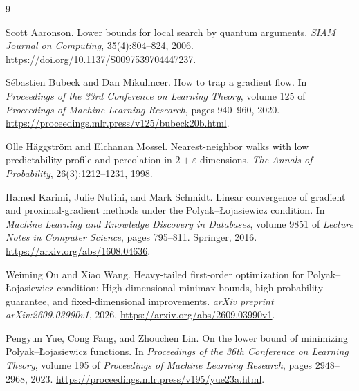 \documentclass[11pt,a4paper]{article}
\theoremstyle{definition}
\theoremstyle{remark}
\begin{document}
\begin{thebibliography}{9}

Scott Aaronson.
\newblock Lower bounds for local search by quantum arguments.
\newblock \emph{SIAM Journal on Computing}, 35(4):804--824, 2006.
\newblock \url{https://doi.org/10.1137/S0097539704447237}.

S\'ebastien Bubeck and Dan Mikulincer.
\newblock How to trap a gradient flow.
\newblock In \emph{Proceedings of the 33rd Conference on Learning Theory},
volume 125 of \emph{Proceedings of Machine Learning Research},
pages 940--960, 2020.
\newblock \url{https://proceedings.mlr.press/v125/bubeck20b.html}.

Olle H\"aggstr\"om and Elchanan Mossel.
\newblock Nearest-neighbor walks with low predictability profile and
percolation in $2+\varepsilon$ dimensions.
\newblock \emph{The Annals of Probability}, 26(3):1212--1231, 1998.

Hamed Karimi, Julie Nutini, and Mark Schmidt.
\newblock Linear convergence of gradient and proximal-gradient methods
under the Polyak--\L{}ojasiewicz condition.
\newblock In \emph{Machine Learning and Knowledge Discovery in Databases},
volume 9851 of \emph{Lecture Notes in Computer Science},
pages 795--811. Springer, 2016.
\newblock \url{https://arxiv.org/abs/1608.04636}.

Weiming Ou and Xiao Wang.
\newblock Heavy-tailed first-order optimization for
Polyak--\L{}ojasiewicz condition: High-dimensional minimax bounds,
high-probability guarantee, and fixed-dimensional improvements.
\newblock \emph{arXiv preprint arXiv:2609.03990v1}, 2026.
\newblock \url{https://arxiv.org/abs/2609.03990v1}.

Pengyun Yue, Cong Fang, and Zhouchen Lin.
\newblock On the lower bound of minimizing
Polyak--\L{}ojasiewicz functions.
\newblock In \emph{Proceedings of the 36th Conference on Learning Theory},
volume 195 of \emph{Proceedings of Machine Learning Research},
pages 2948--2968, 2023.
\newblock \url{https://proceedings.mlr.press/v195/yue23a.html}.

\end{thebibliography}
\end{document}
